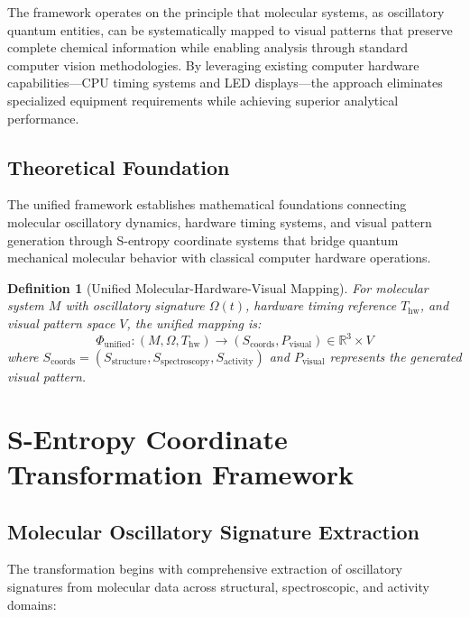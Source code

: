 \documentclass[12pt,a4paper]{article}
\newtheorem{definition}[theorem]{Definition}
\begin{document}
The framework operates on the principle that molecular systems, as oscillatory quantum entities, can be systematically mapped to visual patterns that preserve complete chemical information while enabling analysis through standard computer vision methodologies. By leveraging existing computer hardware capabilities—CPU timing systems and LED displays—the approach eliminates specialized equipment requirements while achieving superior analytical performance.

\subsection{Theoretical Foundation}

The unified framework establishes mathematical foundations connecting molecular oscillatory dynamics, hardware timing systems, and visual pattern generation through S-entropy coordinate systems that bridge quantum mechanical molecular behavior with classical computer hardware operations.

\begin{definition}[Unified Molecular-Hardware-Visual Mapping]
For molecular system $M$ with oscillatory signature $\Omega(t)$, hardware timing reference $T_{\text{hw}}$, and visual pattern space $V$, the unified mapping is:
\begin{equation}
\Phi_{\text{unified}}: (M, \Omega, T_{\text{hw}}) \rightarrow (S_{\text{coords}}, P_{\text{visual}}) \in \mathbb{R}^3 \times V
\end{equation}
where $S_{\text{coords}} = (S_{\text{structure}}, S_{\text{spectroscopy}}, S_{\text{activity}})$ and $P_{\text{visual}}$ represents the generated visual pattern.
\end{definition}

\section{S-Entropy Coordinate Transformation Framework}

\subsection{Molecular Oscillatory Signature Extraction}

The transformation begins with comprehensive extraction of oscillatory signatures from molecular data across structural, spectroscopic, and activity domains:
\end{document}
